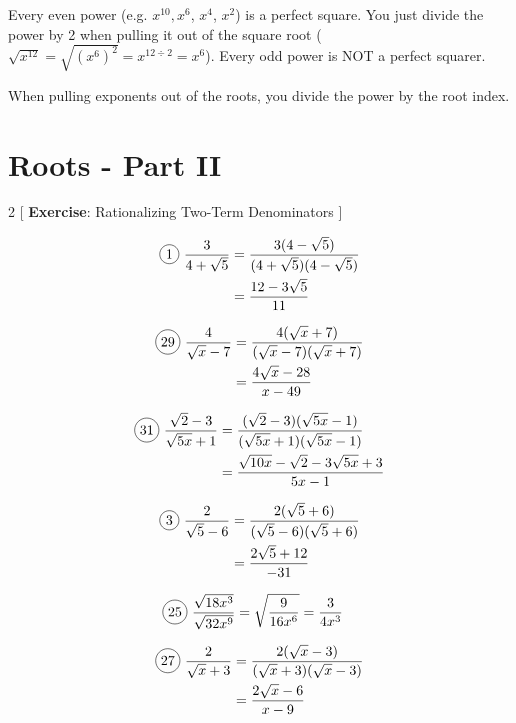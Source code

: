 Every even power (e.g. $x^{10}, $$x^{6}$, $x^{4}$, $x^{2}$) is a perfect square. You just divide the power by 2 when pulling it out of the square root ($\sqrt{x^{12}}=\sqrt{(x^{6})^{2}}=x^{12\div 2}=x^{6}$). Every odd power is NOT a perfect squarer.

When pulling exponents out of the roots, you divide the power by the root index.

\section{Roots - Part II}


\begin{multicols}{2}
[
  \textbf{Exercise}: Rationalizing Two-Term Denominators
]

\begin{align*}
  \circled{1}\ \frac{3}{4+\sqrt{5}}&=\frac{3(4-\sqrt{5})}{(4+\sqrt{5})(4-\sqrt{5})}\\
  &=\frac{12-3\sqrt{5}}{11}
\end{align*}

\begin{align*}
  \circled{29}\ \frac{4}{\sqrt{x}-7}&=\frac{4(\sqrt{x}+7)}{(\sqrt{x}-7)(\sqrt{x}+7)}\\
  &=\frac{4\sqrt{x}-28}{x-49}
\end{align*}

\begin{align*}
  \circled{31}\ \frac{\sqrt{2}-3}{\sqrt{5x}+1}&=\frac{(\sqrt{2}-3)(\sqrt{5x}-1)}{(\sqrt{5x}+1)(\sqrt{5x}-1)}\\
  &=\frac{\sqrt{10x}-\sqrt{2}-3\sqrt{5x}+3}{5x-1}
\end{align*}

\begin{align*}
  \circled{3}\ \frac{2}{\sqrt{5}-6}&=\frac{2(\sqrt{5}+6)}{(\sqrt{5}-6)(\sqrt{5}+6)}\\
  &=\frac{2\sqrt{5}+12}{-31}
\end{align*}

\begin{align*}
  \circled{25}\ \frac{\sqrt{18x^{3}}}{\sqrt{32x^{9}}}&=\sqrt{\frac{9}{16x^{6}}}=\frac{3}{4x^{3}}
\end{align*}

\begin{align*}
  \circled{27}\ \frac{2}{\sqrt{x}+3}&=\frac{2(\sqrt{x}-3)}{(\sqrt{x}+3)(\sqrt{x}-3)}\\
  &=\frac{2\sqrt{x}-6}{x-9}
\end{align*}

\end{multicols}

